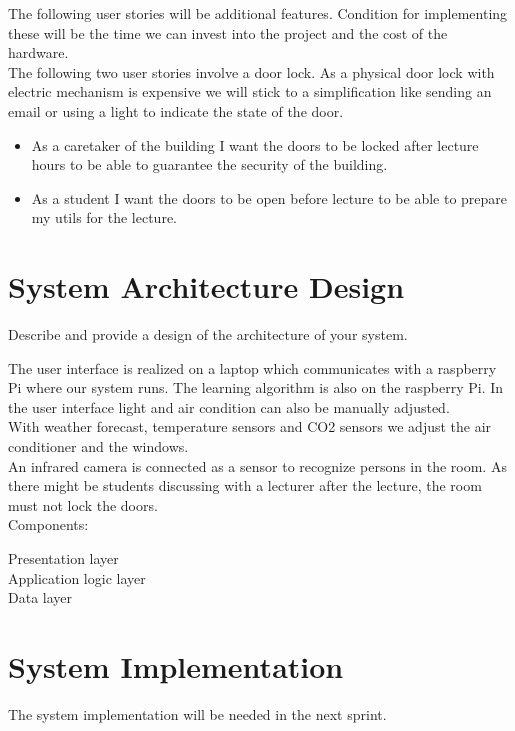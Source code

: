 \documentclass[runningheads]{llncs}
\begin{document}
The following user stories will be additional features. Condition for implementing these will be the time we can invest into the project and the cost of the hardware.\\ 

The following two user stories involve a door lock. As a physical door lock with electric mechanism is expensive we will stick to a simplification like sending an email or using a light to indicate the state of the door.\\
\begin{itemize}
\item As a caretaker of the building I want the doors to be locked after lecture hours to be able to guarantee the security of the building. \\

\item As a student I want the doors to be open before lecture to be able to prepare my utils for the lecture.\\
\end{itemize}

\section{System Architecture Design}
Describe and provide a design of the architecture of your system.

The user interface is realized on a laptop which communicates with a raspberry Pi where our system runs. The learning algorithm is also on the raspberry Pi. In the user interface light and air condition can also be manually adjusted.\\

With weather forecast, temperature sensors and CO2 sensors we adjust the air conditioner and the windows. \\

An infrared camera is connected as a sensor to recognize persons in the room. As there might be students discussing with a lecturer after the lecture, the room must not lock the doors. \\ 



Components:


Presentation layer\\
Application logic layer\\
Data layer \\

\section{System Implementation}
The system implementation will be needed in the next sprint.
\end{document}

